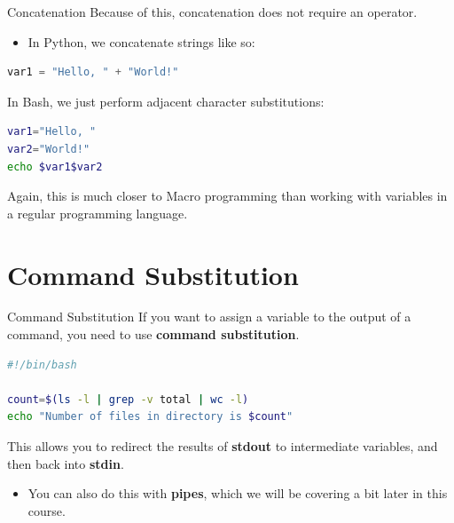\documentclass[11pt]{beamer}
\begin{document}
\begin{frame}[fragile=singleslide]{Concatenation}
Because of this, concatenation does not require an operator.  
\begin{itemize}
\item In Python, we concatenate strings like so:
\end{itemize}
\begin{lstlisting}[style=C, language=python]
var1 = "Hello, " + "World!"
\end{lstlisting}
In Bash, we just perform adjacent character substitutions:
\begin{lstlisting}[style=terminal, language=bash]
var1="Hello, "
var2="World!"
echo $var1$var2
\end{lstlisting}
Again, this is much closer to Macro programming than working with variables in a regular programming language.  
\end{frame}

\section[Substitution]{Command Substitution}
\begin{frame}[fragile=singleslide]{Command Substitution}
If you want to assign a variable to the output of a command, you need to use \textbf{command substitution}.

\begin{lstlisting}[style=terminal, language=bash]
#!/bin/bash

count=$(ls -l | grep -v total | wc -l)
echo "Number of files in directory is $count"
\end{lstlisting}
This allows you to redirect the results of \textbf{stdout} to intermediate variables, and then back into \textbf{stdin}. 
\begin{itemize}
\item You can also do this with \textbf{pipes}, which we will be covering a bit later in this course.
\end{itemize}
\end{frame}
\end{document}
